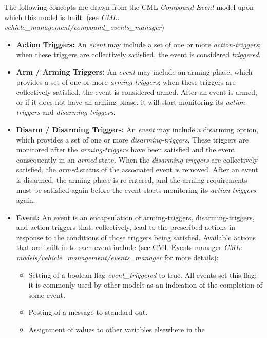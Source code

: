 \documentclass[11pt,fleqn]{report}
\begin{document}
The following concepts are drawn from the CML \textit{Compound-Event} model
upon which this model is built:
(see \textit{CML: vehicle\_management/compound\_events\_manager})
\begin{itemize}
  \item \textbf{Action Triggers:}
        An \textit{event} may include a set of one or more
        \textit{action-triggers}; when these triggers
        are collectively satisfied, the event is considered \textit{triggered}.
  \item \textbf{Arm / Arming Triggers:}
        An \textit{event} may include an arming phase, which provides
        a set of one or more  \textit{arming-triggers}; when these triggers
        are collectively satisfied, the event is considered armed.
        After an event is armed, or if it does not have an arming phase, it
        will start monitoring its \textit{action-triggers} and
        \textit{disarming-triggers}.
  \item \textbf{Disarm / Disarming Triggers:}
        An \textit{event} may include a disarming option, which provides
        a set of one or more  \textit{disarming-triggers}. These triggers
        are monitored after the \textit{arming-triggers} have been satisfied
        and the event consequently in an \textit{armed} state. When the
        \textit{disarming-triggers}
        are collectively satisfied, the  \textit{armed} status of the
        associated event is removed.
        After an event is disarmed, the arming phase is re-entered, and the
        arming requirements must be satisfied again before the event starts
        monitoring its  \textit{action-triggers} again.
  \item \textbf{Event:}
        An event is an encapsulation of arming-triggers, disarming-triggers,
        and action-triggers that, collectively, lead to the prescribed
        actions in response to the conditions of those triggers being
        satisfied. Available actions that are built-in to each event
        include (see CML Events-manager \textit{CML:
        models/vehicle\_management/events\_manager} for more details):
  \begin{itemize}
    \item Setting of a boolean flag \textit{event\_triggered} to true. All
          events set this flag; it is commonly used by other models as an
          indication of the completion of some event.
    \item Posting of a message to standard-out.
    \item Assignment of values to other variables elsewhere in the

\end{itemize}
\end{itemize}
\end{document}
